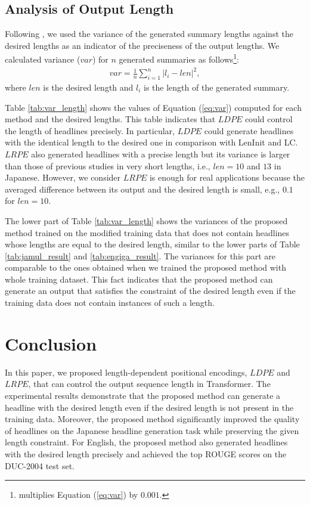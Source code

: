\documentclass[11pt,a4paper]{article}
\begin{document}
\subsection{Analysis of Output Length}\label{sec:analysis}
Following , we used the variance of the generated summary lengths against the desired lengths as an indicator of the preciseness of the output lengths.
We calculated variance ($var$) for $n$ generated summaries as follows\footnote{ multiplies Equation (\ref{eq:var}) by $0.001$.}:
\begin{align}
  var = \frac{1}{n} \sum_{i=1}^{n} |l_i - len|^{2}, \label{eq:var}
\end{align}
where $len$ is the desired length and $l_i$ is the length of the generated summary.


Table \ref{tab:var_length} shows the values of Equation (\ref{eq:var}) computed for each method and the desired lengths.
This table indicates that $LDPE$ could control the length of headlines precisely.
In particular, $LDPE$ could generate headlines with the identical length to the desired one in comparison with LenInit and LC.
$LRPE$ also generated headlines with a precise length but its variance is larger than those of previous studies in very short lengths, i.e., $len = 10$ and $13$ in Japanese.
However, we consider $LRPE$ is enough for real applications because the averaged difference between its output and the desired length is small, e.g., $0.1$ for $len = 10$.


The lower part of Table \ref{tab:var_length} shows the variances of the proposed method trained on the modified training data that does not contain headlines whose lengths are equal to the desired length, similar to the lower parts of Table \ref{tab:jamul_result} and \ref{tab:engiga_result}.
The variances for this part are comparable to the ones obtained when we trained the proposed method with whole training dataset.
This fact indicates that the proposed method can generate an output that satisfies the constraint of the desired length even if the training data does not contain instances of such a length.


\section{Conclusion}
In this paper, we proposed length-dependent positional encodings, $LDPE$ and $LRPE$, that can control the output sequence length in Transformer.
The experimental results demonstrate that the proposed method can generate a headline with the desired length even if the desired length is not present in the training data.
Moreover, the proposed method significantly improved the quality of headlines on the Japanese headline generation task while preserving the given length constraint.
For English, the proposed method also generated headlines with the desired length precisely and achieved the top ROUGE scores on the DUC-2004 test set.
\end{document}
